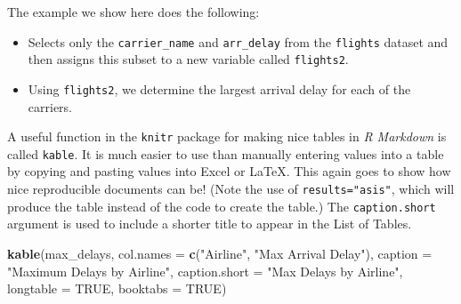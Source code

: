 \documentclass [11pt, proquest] {uwthesis}[2015/03/03]
\newenvironment{Shaded}{}{}
\newcommand{\KeywordTok}[1]{\textcolor[rgb]{0.00,0.44,0.13}{\textbf{{#1}}}}
\newcommand{\DataTypeTok}[1]{\textcolor[rgb]{0.56,0.13,0.00}{{#1}}}
\newcommand{\StringTok}[1]{\textcolor[rgb]{0.25,0.44,0.63}{{#1}}}
\newcommand{\OtherTok}[1]{\textcolor[rgb]{0.00,0.44,0.13}{{#1}}}
\newcommand{\NormalTok}[1]{{#1}}
\begin{document}
The example we show here does the following:
\begin{itemize}
\item
  Selects only the \texttt{carrier\_name} and \texttt{arr\_delay} from
  the \texttt{flights} dataset and then assigns this subset to a new
  variable called \texttt{flights2}.
\item
  Using \texttt{flights2}, we determine the largest arrival delay for
  each of the carriers.
\end{itemize}
\begin{Shaded}
\end{Shaded}
A useful function in the \texttt{knitr} package for making nice tables
in \emph{R Markdown} is called \texttt{kable}. It is much easier to use
than manually entering values into a table by copying and pasting values
into Excel or LaTeX. This again goes to show how nice reproducible
documents can be! (Note the use of \texttt{results="asis"}, which will
produce the table instead of the code to create the table.) The
\texttt{caption.short} argument is used to include a shorter title to
appear in the List of Tables.
\begin{Shaded}
\begin{Highlighting}[]
\KeywordTok{kable}\NormalTok{(max_delays, }
      \DataTypeTok{col.names =} \KeywordTok{c}\NormalTok{(}\StringTok{"Airline"}\NormalTok{, }\StringTok{"Max Arrival Delay"}\NormalTok{),}
      \DataTypeTok{caption =} \StringTok{"Maximum Delays by Airline"}\NormalTok{,}
      \DataTypeTok{caption.short =} \StringTok{"Max Delays by Airline"}\NormalTok{,}
      \DataTypeTok{longtable =} \OtherTok{TRUE}\NormalTok{,}
      \DataTypeTok{booktabs =} \OtherTok{TRUE}\NormalTok{)}
\end{Highlighting}
\end{Shaded}
\end{document}
